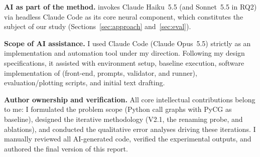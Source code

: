 \textbf{AI as part of the method.} \nscg invokes Claude Haiku~5.5 (and Sonnet~5.5 in RQ2) via headless Claude Code as its core neural component, which constitutes the subject of our study (Sections~\ref{sec:approach} and~\ref{sec:eval}).

\textbf{Scope of AI assistance.} I used Claude Code (Claude Opus~5.5) strictly as an implementation and automation tool under my direction. Following my design specifications, it assisted with environment setup, baseline execution, software implementation of \nscg (front-end, prompts, validator, and runner), evaluation/plotting scripts, and initial text drafting.

\textbf{Author ownership and verification.} All core intellectual contributions belong to me: I formulated the problem scope (Python call graphs with PyCG as baseline), designed the iterative methodology (V2.1, the renaming probe, and ablations), and conducted the qualitative error analyses driving these iterations. I manually reviewed all AI-generated code, verified the experimental outputs, and authored the final version of this report.